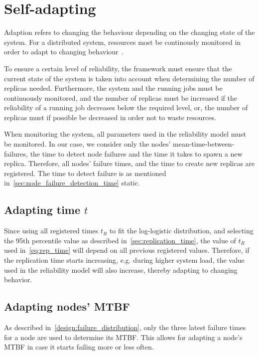 \documentclass{cslthse-msc}
\begin{document}
\section{Self-adapting} \label{sec:design_self_adapting}
Adaption refers to changing the behaviour depending on the changing state of the system. For a distributed system, resources most be continously monitored in order to adapt to changing behaviour~\cite{imprRelAdaptRL}.

To ensure a certain level of reliability, the framework must ensure that the current state of the system is taken into account when determining the number of replicas needed. Furthermore, the system and the running jobs must be continuously monitored, and the number of replicas must be increased if the reliability of a running job decreases below the required level, or, the number of replicas must if possible be decreased in order not to waste resources.

When monitoring the system, all parameters used in the reliability model must be monitored. In our case, we consider only the nodes' mean-time-between-failures, the time to detect node failures and the time it takes to spawn a new replica. Therefore, all nodes' failure times, and the time to create new replicas are registered. The time to detect failure is as mentioned in~\cref{sec:node_failure_detection_time} static.

\subsection{Adapting time $t$}
Since using all registered times $t_R$ to fit the log-logistic distribution, and selecting the 95th percentile value as described in~\cref{sec:replication_time}, the value of $t_R$ used in~\cref{eq:rep_time} will depend on all previous registered values. Therefore, if the replication time starts increasing, e.g. during higher system load, the value used in the reliability model will also increase, thereby adapting to changing behavior. 

\subsection{Adapting nodes' MTBF} \label{sec:design_self_adapting_mtbf}
As described in~\cref{design:failure_distribution}, only the three latest failure times for a node are used to determine its MTBF. This allows for adapting a node's MTBF in case it starts failing more or less often. 
\end{document}
